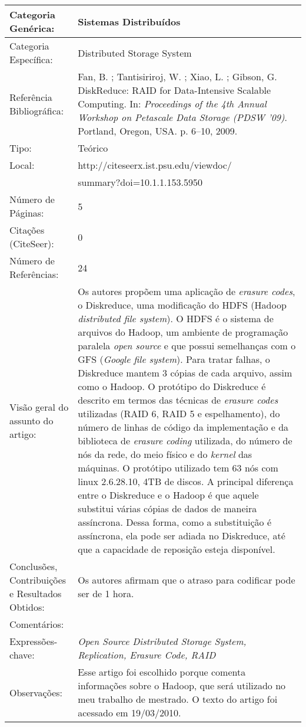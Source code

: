 \documentclass[10pt,a4paper]{article}
\begin{document}
\begin{center}
\begin{tabular}{|p{5cm}||p{10cm}|}
\hline

Categoria Genérica: & Sistemas Distribuídos\\\hline
Categoria Específica: & Distributed Storage System\\\hline
Referência Bibliográfica: & Fan, B. ; Tantisiriroj, W. ; Xiao, L. ; Gibson, G. DiskReduce: RAID for Data-Intensive Scalable Computing. In:  \emph{Proceedings of the 4th Annual Workshop on Petascale Data Storage (PDSW '09)}. Portland, Oregon, USA. p. 6--10, 2009.\\\hline
Tipo: & Teórico\\\hline
Local: & http://citeseerx.ist.psu.edu/viewdoc/\\ &summary?doi=10.1.1.153.5950\\\hline
Número de Páginas: & 5\\\hline
Citações (CiteSeer): & 0\\\hline
Número de Referências: & 24\\\hline
Visão geral do assunto do artigo: & Os autores propõem uma aplicação de \emph{erasure codes}, o Diskreduce, uma modificação do HDFS (Hadoop \emph{distributed file system}). O HDFS é o sistema de arquivos do Hadoop, um ambiente de programação paralela \emph{open source} e que possui semelhanças com o GFS (\emph{Google file system}). Para tratar falhas, o Diskreduce mantem $3$ cópias de cada arquivo, assim como o Hadoop. O protótipo do Diskreduce é descrito em termos das técnicas de \emph{erasure codes} utilizadas (RAID 6, RAID 5 e espelhamento), do número de linhas de código da implementação e da biblioteca de \emph{erasure coding} utilizada, do número de nós da rede, do meio físico e do \emph{kernel} das máquinas. O protótipo utilizado tem 63 nós com linux 2.6.28.10, 4TB de discos. A principal diferença entre o Diskreduce e o Hadoop é que aquele substitui várias cópias de dados de maneira assíncrona. Dessa forma, como a substituição é assíncrona, ela pode ser adiada no Diskreduce, até que a capacidade de reposição esteja disponível.\\\hline
Conclusões, Contribuições e Resultados Obtidos: & Os autores afirmam que o atraso para codificar pode ser de 1 hora.\\\hline
Comentários: & \\\hline
Expressões-chave: & \emph{Open Source Distributed Storage System, Replication, Erasure Code, RAID}\\\hline
Observações: & Esse artigo foi escolhido porque comenta informações sobre o Hadoop, que será utilizado no meu trabalho de mestrado. O texto do artigo foi acessado em 19/03/2010.\\\hline

\end{tabular}
\end{center}
\end{document}
